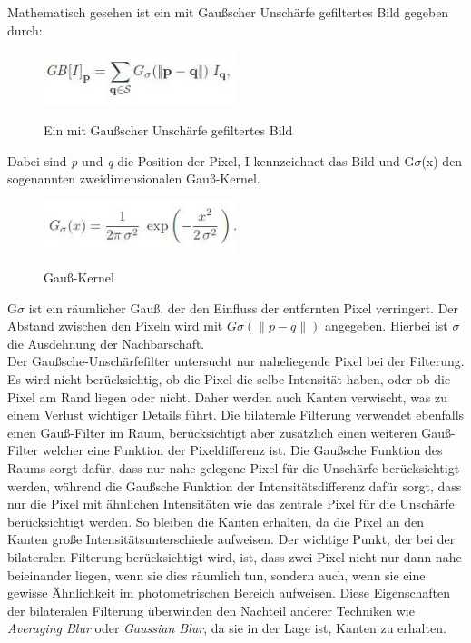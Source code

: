 Mathematisch gesehen ist ein mit Gaußscher Unschärfe gefiltertes Bild gegeben durch:
\begin{figure}[H]
    \centering
    \includegraphics[width=0.5\textwidth]{pics/GBFilteredPic.jpeg}
    \caption{Ein mit Gaußscher Unschärfe gefiltertes Bild}
    \cite{GBfilteredPicture}
    \label{fig:anpr_2}
    \end{figure}
Dabei sind \textit{p} und \textit{q} die Position der Pixel, I kennzeichnet das Bild und G\(\sigma\)(x) den sogenannten zweidimensionalen Gauß-Kernel. 
\begin{figure}[H]
    \centering
    \includegraphics[width=0.5\textwidth]{pics/Gaussian-Filter-Formula-2.jpeg}
    \caption{Gauß-Kernel}
    \cite{GBfilteredPicture2}
    \label{fig:anpr_3}
    \end{figure}
    G\(\sigma\) ist ein räumlicher Gauß, der den Einfluss der entfernten Pixel verringert. Der Abstand zwischen den Pixeln wird mit \(G\sigma(\|p-q\|)\) angegeben. Hierbei ist \(\sigma\) die Ausdehnung der Nachbarschaft.\\
    Der Gaußsche-Unschärfefilter untersucht nur naheliegende Pixel bei der Filterung. Es wird nicht berücksichtig, ob die Pixel die selbe Intensität haben, oder ob die Pixel am Rand liegen oder nicht. Daher werden auch Kanten verwischt, was zu einem Verlust wichtiger Details führt. Die bilaterale Filterung verwendet ebenfalls einen Gauß-Filter im Raum, berücksichtigt aber zusätzlich einen weiteren Gauß-Filter welcher eine Funktion der Pixeldifferenz ist. Die Gaußsche Funktion des Raums sorgt dafür, dass nur nahe gelegene Pixel für die Unschärfe berücksichtigt werden, während die Gaußsche Funktion der Intensitätsdifferenz dafür sorgt, dass nur die Pixel mit ähnlichen Intensitäten wie das zentrale Pixel für die Unschärfe berücksichtigt werden. So bleiben die Kanten erhalten, da die Pixel an den Kanten große Intensitätsunterschiede aufweisen.
    Der wichtige Punkt, der bei der bilateralen Filterung berücksichtigt wird, ist, dass zwei Pixel nicht nur dann nahe beieinander liegen, wenn sie dies räumlich tun, sondern auch, wenn sie eine gewisse Ähnlichkeit im photometrischen Bereich aufweisen. Diese Eigenschaften der bilateralen Filterung überwinden den Nachteil anderer Techniken wie \textit{Averaging Blur} oder \textit{Gaussian Blur}, da sie in der Lage ist, Kanten zu erhalten.\\
